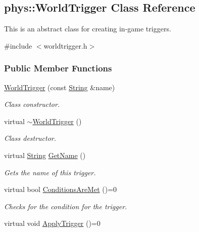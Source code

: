 \hypertarget{classphys_1_1WorldTrigger}{
\subsection{phys::WorldTrigger Class Reference}
\label{df/d1c/classphys_1_1WorldTrigger}
}


This is an abstract class for creating in-\/game triggers.  




{\ttfamily \#include $<$worldtrigger.h$>$}

\subsubsection*{Public Member Functions}
\begin{DoxyCompactItemize}
\item 
\hyperlink{classphys_1_1WorldTrigger_a1876d1c7c58b10b2fd1ad1cb7727e6a6}{WorldTrigger} (const \hyperlink{namespacephys_aa03900411993de7fbfec4789bc1d392e}{String} \&name)
\begin{DoxyCompactList}\small\item\em Class constructor. \item\end{DoxyCompactList}\item 
\hypertarget{classphys_1_1WorldTrigger_ad70dd18dc895166db6cc890042b0203f}{
virtual \hyperlink{classphys_1_1WorldTrigger_ad70dd18dc895166db6cc890042b0203f}{$\sim$WorldTrigger} ()}
\label{df/d1c/classphys_1_1WorldTrigger_ad70dd18dc895166db6cc890042b0203f}

\begin{DoxyCompactList}\small\item\em Class destructor. \item\end{DoxyCompactList}\item 
virtual \hyperlink{namespacephys_aa03900411993de7fbfec4789bc1d392e}{String} \hyperlink{classphys_1_1WorldTrigger_a01805ed31ae69ade9e4ef21bef5f341e}{GetName} ()
\begin{DoxyCompactList}\small\item\em Gets the name of this trigger. \item\end{DoxyCompactList}\item 
virtual bool \hyperlink{classphys_1_1WorldTrigger_aa95304a06027cd15bf56ad018c7adda8}{ConditionsAreMet} ()=0
\begin{DoxyCompactList}\small\item\em Checks for the condition for the trigger. \item\end{DoxyCompactList}\item 
\hypertarget{classphys_1_1WorldTrigger_adb7801edf1195f2f7791ad9c4d91af88}{
virtual void \hyperlink{classphys_1_1WorldTrigger_adb7801edf1195f2f7791ad9c4d91af88}{ApplyTrigger} ()=0}
\label{df/d1c/classphys_1_1WorldTrigger_adb7801edf1195f2f7791ad9c4d91af88}


\end{DoxyCompactItemize}
